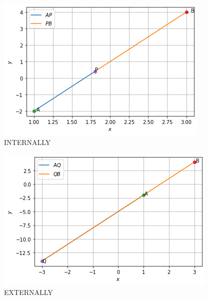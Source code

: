 \documentclass[journal,12pt,twocolumn]{IEEEtran}
\begin{document}
\begin{figure}[!ht]
    \centering
\includegraphics[width=\columnwidth]{internally.png}
    \caption{INTERNALLY}
    \label{fig:Internally.}
\end{figure} 
\begin{figure}[!ht]
    \centering
\includegraphics[width=\columnwidth]{externally.png}
    \caption{EXTERNALLY}
    \label{fig:EXTERNALLY.}
\end{figure}  
\end{document}
